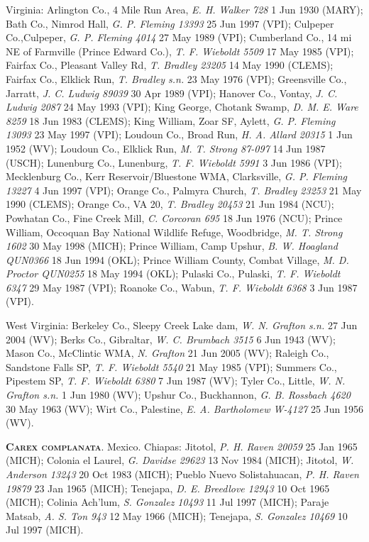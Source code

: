 \documentclass{article}
\begin{document}
Virginia:
Arlington Co., 4 Mile Run Area, \textit{E. H. Walker 728} 1 Jun 1930 (MARY);
Bath Co., Nimrod Hall, \textit{G. P. Fleming 13393} 25 Jun 1997 (VPI);
Culpeper Co.,Culpeper, \textit{G. P. Fleming 4014} 27 May 1989 (VPI);
Cumberland Co., 14 mi NE of Farmville (Prince Edward Co.), \textit{T. F. Wieboldt 5509} 17 May 1985 (VPI);
Fairfax Co., Pleasant Valley Rd, \textit{T. Bradley 23205} 14 May 1990 (CLEMS);
Fairfax Co., Elklick Run, \textit{T. Bradley s.n.} 23 May 1976 (VPI);
Greensville Co., Jarratt, \textit{J. C. Ludwig 89039} 30 Apr 1989 (VPI);
Hanover Co., Vontay, \textit{J. C. Ludwig 2087} 24 May 1993 (VPI);
King George, Chotank Swamp, \textit{ D. M. E. Ware 8259} 18 Jun 1983 (CLEMS);
King William, Zoar SF, Aylett, \textit{G. P. Fleming 13093} 23 May 1997 (VPI);
Loudoun Co., Broad Run, \textit{H. A. Allard 20315} 1 Jun 1952 (WV);
Loudoun Co., Elklick Run, \textit{M. T. Strong 87-097} 14 Jun 1987 (USCH);
Lunenburg Co., Lunenburg, \textit{T. F. Wieboldt 5991} 3 Jun 1986 (VPI);
Mecklenburg Co., Kerr Reservoir/Bluestone WMA,  Clarksville, \textit{G. P. Fleming 13227} 4 Jun 1997 (VPI);
Orange Co., Palmyra Church, \textit{T. Bradley 23253} 21 May 1990 (CLEMS);
Orange Co., VA 20, \textit{T. Bradley 20453} 21 Jun 1984 (NCU);
Powhatan Co., Fine Creek Mill, \textit{C. Corcoran 695} 18 Jun 1976 (NCU);
Prince William, Occoquan Bay National Wildlife Refuge, Woodbridge, \textit{M. T. Strong 1602}	30 May 1998 (MICH);
Prince William, Camp Upshur, \textit{B. W. Hoagland QUN0366} 18 Jun 1994 (OKL);
Prince William County, Combat Village, \textit{M. D. Proctor QUN0255} 18 May 1994 (OKL);
Pulaski Co., Pulaski, \textit{T. F. Wieboldt 6347} 29 May 1987 (VPI);
Roanoke Co., Wabun, \textit{T. F. Wieboldt 6368} 3 Jun 1987 (VPI).

West Virginia:
Berkeley Co., Sleepy Creek Lake dam, \textit{W. N. Grafton s.n.} 27 Jun 2004 (WV);
Berks Co., Gibraltar, \textit{W. C. Brumbach 3515} 6 Jun 1943 (WV);
Mason Co., McClintic WMA, \textit{N. Grafton} 21 Jun 2005 (WV);
Raleigh Co., Sandstone Falls SP, \textit{T. F. Wieboldt 5540} 21 May 1985 (VPI);
Summers Co., Pipestem SP, \textit{T. F. Wieboldt 6380} 7 Jun 1987 (WV);
Tyler Co., Little, \textit{W. N. Grafton s.n.} 1 Jun 1980 (WV);
Upshur Co., Buckhannon, \textit{G. B. Rossbach 4620} 30 May 1963 (WV);
Wirt Co., Palestine, \textit{E. A. Bartholomew W-4127} 25 Jun 1956 (WV).

\textbf{\textsc{Carex complanata}}. 
Mexico.
Chiapas:
Jitotol, \textit{P. H. Raven 20059} 25 Jan 1965 (MICH);
Colonia el Laurel, \textit{G. Davidse 29623} 13 Nov 1984 (MICH);
Jitotol, \textit{W. Anderson 13243} 20 Oct 1983 (MICH);
Pueblo Nuevo Solistahuacan, \textit{P. H. Raven 19879} 23 Jan 1965 (MICH);
Tenejapa, \textit{D. E. Breedlove 12943} 10 Oct 1965 (MICH);
Colinia Ach'lum, \textit{S. Gonzalez 10493} 11 Jul 1997 (MICH);
Paraje Matsab, \textit{A. S. Ton 943} 12 May 1966 (MICH);
Tenejapa, \textit{S. Gonzalez 10469} 10 Jul 1997 (MICH).
\end{document}
